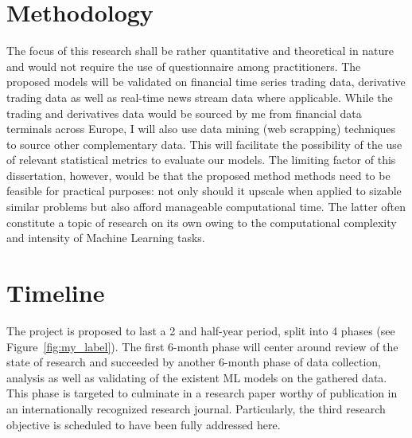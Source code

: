 \documentclass[a4paper,11pt]{scrartcl}
\newcommand{\reffig}[1]{Figure~\ref{#1}}
\begin{document}
%
\section{Methodology}
The focus of this research shall be rather quantitative and theoretical in nature and would not require the use of questionnaire among practitioners.  The proposed models will be validated on financial time series trading data, derivative trading data as well as real-time news stream data where applicable. While the trading and derivatives data would be sourced by me from financial data terminals across Europe, I will also use data mining (web scrapping) techniques to source other complementary data. This will facilitate the possibility of the use of relevant statistical metrics to evaluate our models. The limiting factor of this dissertation, however, would be that the proposed method methods need to be feasible for practical purposes: not only should it upscale when applied to sizable similar problems but also afford manageable computational time. The latter often constitute a topic of research on its own owing to the computational complexity and intensity of Machine Learning tasks.

%
\section{Timeline}
The project is proposed to last a 2 and half-year period, split into 4 phases (see \reffig{fig:my_label}). The first 6-month phase will center around review of the state of research and succeeded by another 6-month phase of data collection, analysis as well as validating of the existent ML models on the gathered data. This phase is targeted to culminate in a research paper worthy of publication in an internationally recognized research journal. Particularly, the third research objective is scheduled to have been fully addressed here.
\end{document}
